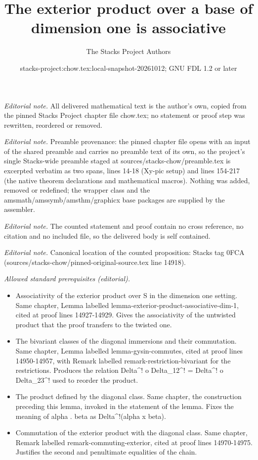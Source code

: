 \documentclass[10pt,a4paper]{amsart}
\title{The exterior product over a base of dimension one is associative}
\author{The Stacks Project Authors}
\date{stacks-project:chow.tex:local-snapshot-20261012; GNU FDL 1.2 or later}
\theoremstyle{plain}
\theoremstyle{definition}
\theoremstyle{remark}
\numberwithin{equation}{subsection}
\begin{document}
\maketitle
\noindent\textit{Editorial note.} All delivered mathematical text is the author's own, copied from the pinned Stacks Project chapter file chow.tex; no statement or proof step was rewritten, reordered or removed.\par\medskip
\noindent\textit{Editorial note.} Preamble provenance: the pinned chapter file opens with an input of the shared preamble and carries no preamble text of its own, so the project's single Stacks-wide preamble staged at sources/stacks-chow/preamble.tex is excerpted verbatim as two spans, lines 14-18 (Xy-pic setup) and lines 154-217 (the native theorem declarations and mathematical macros). Nothing was added, removed or redefined; the wrapper class and the amsmath/amssymb/amsthm/graphicx base packages are supplied by the assembler.\par\medskip
\noindent\textit{Editorial note.} The counted statement and proof contain no cross reference, no citation and no included file, so the delivered body is self contained.\par\medskip
\noindent\textit{Editorial note.} Canonical location of the counted proposition: Stacks tag 0FCA (sources/stacks-chow/pinned-original-source.tex line 14918).\par\medskip
\noindent\textit{Allowed standard prerequisites (editorial).}\begin{itemize}
\item Associativity of the exterior product over S in the dimension one setting. Same chapter, Lemma labelled lemma-exterior-product-associative-dim-1, cited at proof lines 14927-14929. Gives the associativity of the untwisted product that the proof transfers to the twisted one.
\item The bivariant classes of the diagonal immersions and their commutation. Same chapter, Lemma labelled lemma-gysin-commutes, cited at proof lines 14950-14957, with Remark labelled remark-restriction-bivariant for the restrictions. Produces the relation Delta\textasciicircum{}! o Delta\_12\textasciicircum{}! = Delta\textasciicircum{}! o Delta\_23\textasciicircum{}! used to reorder the product.
\item The product defined by the diagonal class. Same chapter, the construction preceding this lemma, invoked in the statement of the lemma. Fixes the meaning of alpha . beta as Delta\textasciicircum{}!(alpha x beta).
\item Commutation of the exterior product with the diagonal class. Same chapter, Remark labelled remark-commuting-exterior, cited at proof lines 14970-14975. Justifies the second and penultimate equalities of the chain.
\end{itemize}\medskip
\end{document}
